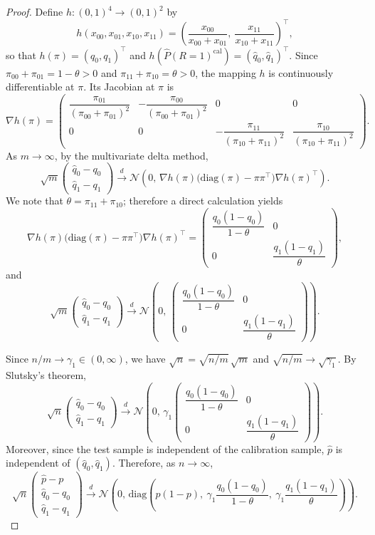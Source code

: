 \begin{proof}
\noindent
Define $h:(0,1)^4\to(0,1)^2$ by
\[
h(x_{00},x_{01},x_{10},x_{11})
=
\left(
\frac{x_{00}}{x_{00}+x_{01}},
\ \frac{x_{11}}{x_{10}+x_{11}}
\right)^{\!\top},
\]
so that $h(\pi)=(q_0,q_1)^\top$ and $h(\hat{P}(R=1)^{\mathrm{cal}})=(\hat q_0,\hat q_1)^\top$.
Since $\pi_{00}+\pi_{01}=1-\theta>0$ and $\pi_{11}+\pi_{10}=\theta>0$, the mapping $h$ is continuously
differentiable at $\pi$. Its Jacobian at $\pi$ is
\[
\nabla h(\pi)
=
\begin{pmatrix}
\dfrac{\pi_{01}}{(\pi_{00}+\pi_{01})^2} &
-\dfrac{\pi_{00}}{(\pi_{00}+\pi_{01})^2} &
0 & 0 \\[10pt]
0 & 0 &
-\dfrac{\pi_{11}}{(\pi_{10}+\pi_{11})^2} &
\dfrac{\pi_{10}}{(\pi_{10}+\pi_{11})^2}
\end{pmatrix}.
\]
As $m\to\infty$, by the multivariate delta method,
\[
\sqrt{m}
\begin{pmatrix}
\hat q_0-q_0\\
\hat q_1-q_1
\end{pmatrix}
\xrightarrow{d}
\mathcal{N}\!\left(
0,\,
\nabla h(\pi)\bigl(\mathrm{diag}(\pi)-\pi\pi^\top\bigr)\nabla h(\pi)^\top
\right).
\]
\noindent
We note that $\theta = \pi_{11}+\pi_{10}$; therefore a direct calculation yields
\[
\nabla h(\pi)\bigl(\mathrm{diag}(\pi)-\pi\pi^\top\bigr)\nabla h(\pi)^\top
=
\begin{pmatrix}
\dfrac{q_0(1-q_0)}{1-\theta} & 0 \\
0 & \dfrac{q_1(1-q_1)}{\theta}
\end{pmatrix},
\] and 
\[
\sqrt{m}
\begin{pmatrix}
\hat q_0-q_0\\
\hat q_1-q_1
\end{pmatrix}
\xrightarrow{d}
\mathcal{N}\!\left(
0,\,
\begin{pmatrix}
\dfrac{q_0(1-q_0)}{1-\theta} & 0 \\
0 & \dfrac{q_1(1-q_1)}{\theta}
\end{pmatrix}
\right).
\]

\noindent
Since $n/m\to\gamma_1\in(0,\infty)$, we have $\sqrt{n}=\sqrt{n/m}\,\sqrt{m}$ and
$\sqrt{n/m}\to\sqrt{\gamma_1}$. By Slutsky's theorem,
\[
\sqrt{n}
\begin{pmatrix}
\hat q_0-q_0\\
\hat q_1-q_1
\end{pmatrix}
\xrightarrow{d}
\mathcal{N}\!\left(
0,\,
\gamma_1
\begin{pmatrix}
\dfrac{q_0(1-q_0)}{1-\theta} & 0 \\
0 & \dfrac{q_1(1-q_1)}{\theta}
\end{pmatrix}
\right).
\]
Moreover, since the test sample is independent of the calibration sample, $\hat{p}$ is independent
of $(\hat q_0,\hat q_1)$. Therefore, as $n\to\infty$,
\[
\sqrt{n}
\begin{pmatrix}
\hat{p}-p\\
\hat q_0-q_0\\
\hat q_1-q_1
\end{pmatrix}
\xrightarrow{d}
\mathcal{N}\!\left(
0,\,
\mathrm{diag}\!\left(
p(1-p),\
\gamma_1\frac{q_0(1-q_0)}{1-\theta},\
\gamma_1\frac{q_1(1-q_1)}{\theta}
\right)
\right).
\]


\end{proof}
